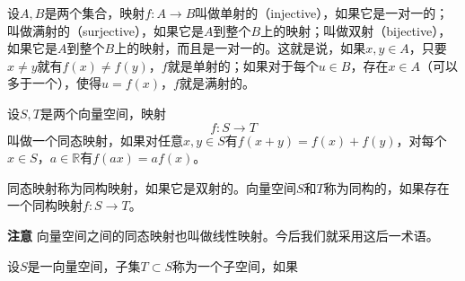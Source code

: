 设$A, B$是两个集合，映射$f: A \to B$叫做单射的（injective），如果它是一对一的；叫做满射的（surjective），如果它是$A$到整个$B$上的映射；叫做双射（bijective），如果它是$A$到整个$B$上的映射，而且是一对一的。这就是说，如果$x, y \in A$，只要$x \neq y$就有$f(x) \neq f(y)$，$f$就是单射的；如果对于每个$u \in B$，存在$x \in A$（可以多于一个），使得$u = f(x)$，$f$就是满射的。

设$S, T$是两个向量空间，映射
\[
f: S \to T
\]
叫做一个同态映射，如果对任意$x, y \in S$有$f(x+y)=f(x)+f(y)$，对每个$x \in S$，$a \in \mathbb{R}$有$f(ax) = af(x)$。

同态映射称为同构映射，如果它是双射的。向量空间$S$和$T$称为同构的，如果存在一个同构映射$f: S \to T$。

\textbf{注意} \quad 向量空间之间的同态映射也叫做线性映射。今后我们就采用这后一术语。

设$S$是一向量空间，子集$T \subset S$称为一个子空间，如果






